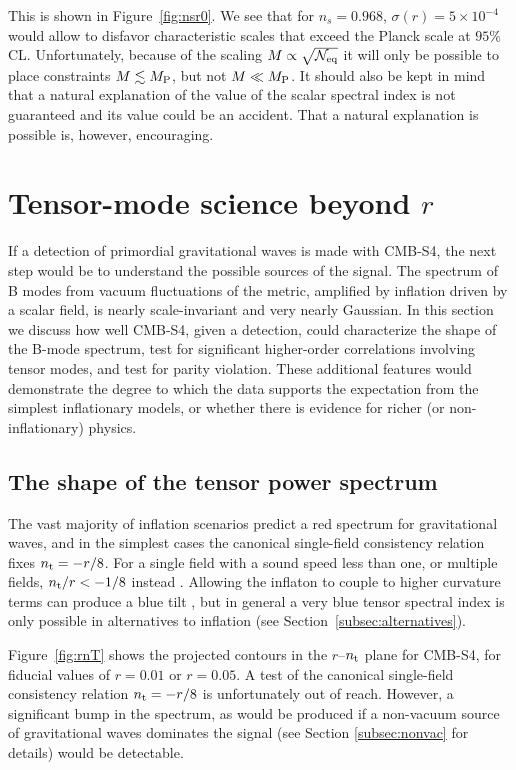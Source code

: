 This is shown in Figure~\ref{fig:nsr0}. We see that for $n_s=0.968$, $\sigma(r)=5\times 10^{-4}$ would allow to disfavor characteristic scales that exceed the Planck scale at $95\%$ CL. Unfortunately, because of the scaling $M\propto \sqrt{\mathcal{N}_{\rm eq}}$ it will only be possible to place constraints $M\lesssim M_{\rm P}$, but not $M\ll M_{\rm P}$. It should also be kept in mind that a natural explanation of the value of the scalar spectral index is not guaranteed and its value could be an accident. That a natural explanation is possible is, however, encouraging.

\section{Tensor-mode science beyond $r$}
\label{sec:beyond_r}

If a detection of primordial gravitational waves is made with CMB-S4, the next step would be to understand the possible sources of the signal. The spectrum of B modes from vacuum fluctuations of the metric, amplified by inflation driven by a scalar field, is nearly scale-invariant and very nearly Gaussian. In this section we discuss how well CMB-S4, given a detection, could characterize the shape of the B-mode spectrum, test for significant higher-order correlations involving tensor modes, and test for parity violation. These additional features would demonstrate the degree to which the data supports the expectation from the simplest inflationary models, or whether there is evidence for richer (or non-inflationary) physics. 

\subsection{The shape of the tensor power spectrum}
The vast majority of inflation scenarios predict a red spectrum for gravitational waves, and in the simplest cases the canonical single-field consistency relation fixes $n_{\rm t}=-r/8$. For a single field with a sound speed less than one, or multiple fields, $n_{\rm t}/r<-1/8$ instead \cite{Price:2014ufa}. Allowing the inflaton to couple to higher curvature terms can produce a blue tilt \cite{Baumann:2015xxa}, but in general a very blue tensor spectral index is only possible in alternatives to inflation (see Section~\ref{subsec:alternatives}). 

Figure~\ref{fig:rnT} shows the projected contours in the $r$--$n_{\rm t}$ plane for CMB-S4, for fiducial values of $r=0.01$ or $r=0.05$. A test of the canonical single-field consistency relation $n_{\rm t}=-r/8$ is unfortunately out of reach. However, a significant bump in the spectrum, as would be produced if a non-vacuum source of gravitational waves dominates the signal \cite{Namba:2015gja} (see Section \ref{subsec:nonvac} for details) would be detectable. 

